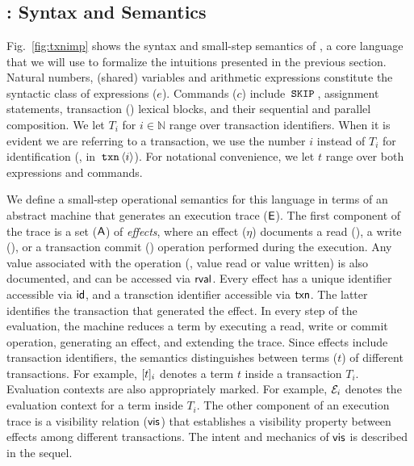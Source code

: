 \section{\txnimp}
\label{sec:syntax}

\subsection{\txnimp: Syntax and Semantics}
\label{sec:opsem}



Fig.~\ref{fig:txnimp} shows the syntax and small-step semantics of
\txnimp, a core language that we will use to formalize the intuitions
presented in the previous section. Natural numbers, (shared) variables
and arithmetic expressions constitute the syntactic class of
expressions ($e$).  Commands ($c$) include $\,{\tt SKIP}\,$, assignment
statements, transaction () lexical blocks, and their sequential
and parallel composition. We let $T_i$ for $i \in \mathbb{N}$ range
over transaction identifiers. When it is evident we are referring to a
transaction, we use the number $i$ instead of $T_i$ for identification
(\eg, in $\,{\tt txn}\,\langle i \rangle$). For notational convenience, we
let $t$ range over both expressions and commands.

We define a small-step operational semantics for this language in
terms of an abstract machine that generates an execution trace
($\textsf{E}$). The first component of the trace is a set ($\textsf{A}$) of
\emph{effects}, where an effect ($\eta$) documents a read (),
a write (), or a transaction commit () operation
performed during the execution. Any value associated with the
operation (\eg, value read or value written) is also documented, and
can be accessed via $\textsf{rval}$. Every effect has a unique identifier
accessible via $\textsf{id}$, and a transction identifier accessible via
$\textsf{txn}$.  The latter identifies the transaction that generated the
effect. In every step of the evaluation, the machine reduces a \txnimp
term by executing a read, write or commit operation, generating an
effect, and extending the trace. Since effects include transaction
identifiers, the semantics distinguishes between terms ($t$) of
different transactions. For example, $\lbrack t \rbrack_i$ denotes a term $t$
inside a transaction $T_i$.  Evaluation contexts are also
appropriately marked. For example, $\mathcal{E}_i$ denotes the evaluation
context for a term inside $T_i$. The other component of an execution
trace is a visibility relation ($\textsf{vis}$) that establishes a visibility
property between effects among different transactions. The intent and
mechanics of $\textsf{vis}$ is described in the sequel.


